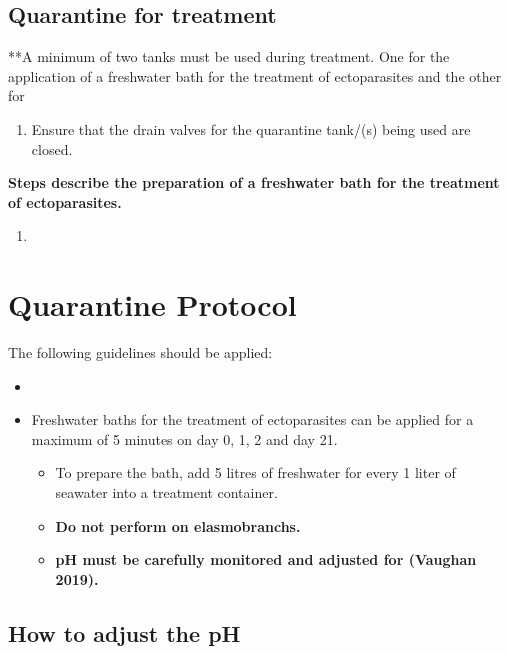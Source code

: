 \documentclass[
  letterpaper,
  DIV=11,
  numbers=noendperiod]{scrreprt}
\providecommand{\tightlist}{%
  \setlength{\itemsep}{0pt}\setlength{\parskip}{0pt}}\usepackage{longtable,booktabs,array}
\begin{document}
\hypertarget{sec-qt-treatment}{%
\subsection{Quarantine for treatment}\label{sec-qt-treatment}}

**A minimum of two tanks must be used during treatment. One for the
application of a freshwater bath for the treatment of ectoparasites and
the other for

\begin{enumerate}
\def\labelenumi{\arabic{enumi}.}
\tightlist
\item
  Ensure that the drain valves for the quarantine tank/(s) being used
  are closed.
\end{enumerate}

\textbf{Steps describe the preparation of a freshwater bath for the
treatment of ectoparasites.}

\begin{enumerate}
\def\labelenumi{\arabic{enumi}.}
\setcounter{enumi}{1}
\tightlist
\item
\end{enumerate}

\hypertarget{sec-q-protocol}{%
\section{Quarantine Protocol}\label{sec-q-protocol}}

The following guidelines should be applied:

\begin{itemize}
\item
\item
  Freshwater baths for the treatment of ectoparasites can be applied for
  a maximum of 5 minutes on day 0, 1, 2 and day 21.

  \begin{itemize}
  \tightlist
  \item
    To prepare the bath, add 5 litres of freshwater for every 1 liter of
    seawater into a treatment container.
  \item
    \textbf{Do not perform on elasmobranchs.}
  \item
    \textbf{pH must be carefully monitored and adjusted for (Vaughan
    2019).}
  \end{itemize}
\end{itemize}

\hypertarget{how-to-adjust-the-ph}{%
\subsection{How to adjust the pH}\label{how-to-adjust-the-ph}}
\end{document}
